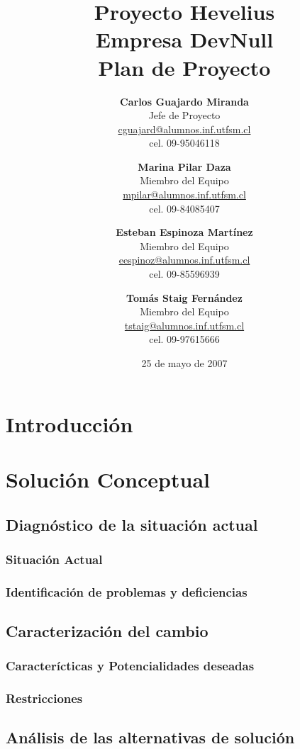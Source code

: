 \documentclass[letterpaper,spanish,10pt]{article}
\title{{\Huge \bf Proyecto Hevelius} \\ {\Large Empresa DevNull} \\ {\small Plan de Proyecto}}
\author{
{\bf Carlos Guajardo Miranda} \\ Jefe de Proyecto \\ \url{cguajard@alumnos.inf.utfsm.cl} \\ cel. 09-95046118 
\and
{\bf Marina Pilar Daza} \\ Miembro del Equipo \\ \url{mpilar@alumnos.inf.utfsm.cl} \\ cel. 09-84085407
\and
{\bf Esteban Espinoza Mart\'inez} \\ Miembro del Equipo \\ \url{eespinoz@alumnos.inf.utfsm.cl} \\ cel. 09-85596939
\and
{\bf Tom\'as Staig Fern\'andez} \\ Miembro del Equipo \\ \url{tstaig@alumnos.inf.utfsm.cl} \\ cel. 09-97615666
}
\date{25 de mayo de 2007}
\begin{document}
\maketitle
\newpage

\tableofcontents{}
\newpage




\section{Introducci\'on} %



\newpage
\section{Soluci\'on Conceptual} %
\subsection{Diagn\'ostico de la situaci\'on actual}
\subsubsection{Situaci\'on Actual}



\subsubsection{Identificaci\'on de problemas y deficiencias}



\subsection{Caracterizaci\'on del cambio}
\subsubsection{Caracter\'icticas y Potencialidades deseadas}



\subsubsection{Restricciones}



\subsection{An\'alisis de las alternativas de soluci\'on}
\end{document}
